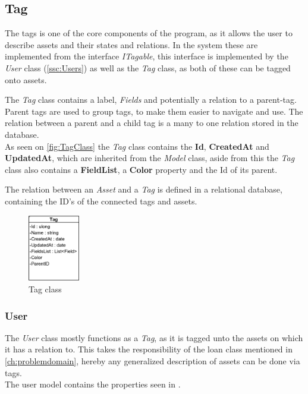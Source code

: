 \subsection{Tag}
The tags is one of the core components of the program, as it allows the user to describe assets and their states and relations. In the system these are implemented from the interface \textit{ITagable}, this interface is implemented by the \textit{User} class (\autoref{ssc:Users}) as well as the \textit{Tag} class, as both of these can be tagged onto assets. \par
The \textit{Tag} class contains a label, \textit{Fields} and potentially a relation to a parent-tag. Parent tags are used to group tags, to make them easier to navigate and use. The relation between a parent and a child tag is a many to one relation stored in the database. \\
As seen on \autoref{fig:TagClass} the \textit{Tag} class contains the \textbf{Id}, \textbf{CreatedAt} and \textbf{UpdatedAt}, which are inherited from the \textit{Model} class, aside from this the \textit{Tag} class also contains a \textbf{FieldList}, a \textbf{Color} property and the Id of its parent. \par
The relation between an \textit{Asset} and a \textit{Tag} is defined in a relational database, containing the ID's of the connected tags and assets.

\begin{figure}[H]
    \centering
    \includegraphics[width=0.2\textwidth]{figures/Implementation/Models/Tag.PNG}
    \caption{Tag class}
    \label{fig:TagClass}
\end{figure}



\subsubsection{User} \label{ssc:Users}
The \textit{User} class mostly functions as a \textit{Tag}, as it is tagged unto the assets on which it has a relation to. This takes the responsibility of the loan class mentioned in \autoref{ch:problemdomain}, hereby any generalized description of assets can be done via tags. \\
The user model contains the properties seen in .